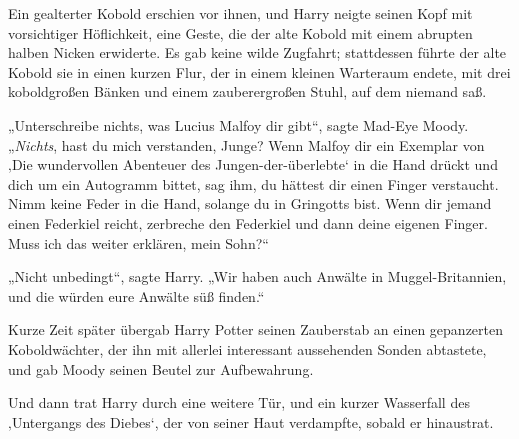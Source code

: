 Ein gealterter Kobold erschien vor ihnen, und Harry neigte seinen Kopf mit vorsichtiger Höflichkeit, eine Geste, die der alte Kobold mit einem abrupten halben Nicken erwiderte. Es gab keine wilde Zugfahrt; stattdessen führte der alte Kobold sie in einen kurzen Flur, der in einem kleinen Warteraum endete, mit drei koboldgroßen Bänken und einem zauberergroßen Stuhl, auf dem niemand saß.

„Unterschreibe nichts, was Lucius Malfoy dir gibt“, sagte Mad-Eye Moody.
„\emph{Nichts}, hast du mich verstanden, Junge? Wenn Malfoy dir ein Exemplar von ‚Die wundervollen Abenteuer des Jungen-der-überlebte‘ in die Hand drückt und dich um ein Autogramm bittet, sag ihm, du hättest dir einen Finger verstaucht. Nimm keine Feder in die Hand, solange du in Gringotts bist. Wenn dir jemand einen Federkiel reicht, zerbreche den Federkiel und dann deine eigenen Finger. Muss ich das weiter erklären, mein Sohn?“

„Nicht unbedingt“, sagte Harry.
„Wir haben auch Anwälte in Muggel-Britannien, und die würden eure Anwälte süß finden.“

Kurze Zeit später übergab Harry Potter seinen Zauberstab an einen gepanzerten Koboldwächter, der ihn mit allerlei interessant aussehenden Sonden abtastete, und gab Moody seinen Beutel zur Aufbewahrung.

Und dann trat Harry durch eine weitere Tür, und ein kurzer Wasserfall des ‚Untergangs des Diebes‘, der von seiner Haut verdampfte, sobald er hinaustrat.

